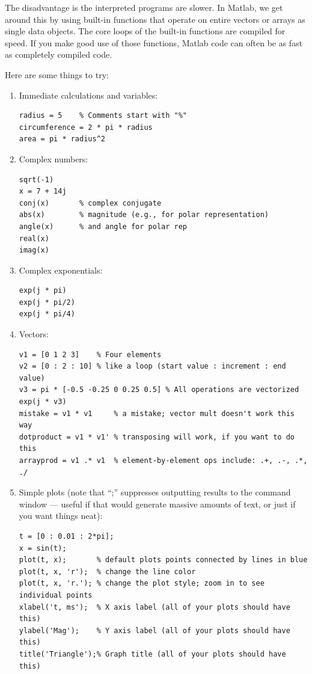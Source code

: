 The disadvantage is the interpreted programs are slower. In Matlab, we
get around this by using built-in functions that operate on entire
vectors or arrays as single data objects. The core loops of the
built-in functions are compiled for speed. If you make good use of
those functions, Matlab code can often be as fast as completely
compiled code.

Here are some things to try:
\begin{enumerate}
\item Immediate calculations and variables:
\begin{lstlisting}[style=Matlab-editor,basicstyle=\mlttfamily\small]
radius = 5    % Comments start with "%"
circumference = 2 * pi * radius
area = pi * radius^2
\end{lstlisting}
\item Complex numbers:
\begin{lstlisting}[style=Matlab-editor,basicstyle=\mlttfamily\small]
sqrt(-1)
x = 7 + 14j
conj(x)       % complex conjugate
abs(x)        % magnitude (e.g., for polar representation)
angle(x)      % and angle for polar rep
real(x)
imag(x)
\end{lstlisting}

\item Complex exponentials:
\begin{lstlisting}[style=Matlab-editor,basicstyle=\mlttfamily\small]
exp(j * pi)
exp(j * pi/2)
exp(j * pi/4)
\end{lstlisting}

\item Vectors:
\begin{lstlisting}[style=Matlab-editor,basicstyle=\mlttfamily\small]
v1 = [0 1 2 3]    % Four elements
v2 = [0 : 2 : 10] % like a loop (start value : increment : end value)
v3 = pi * [-0.5 -0.25 0 0.25 0.5] % All operations are vectorized
exp(j * v3)
mistake = v1 * v1     % a mistake; vector mult doesn't work this way
dotproduct = v1 * v1' % transposing will work, if you want to do this
arrayprod = v1 .* v1  % element-by-element ops include: .+, .-, .*, ./
\end{lstlisting}

\item Simple plots (note that ``;'' suppresses outputting results to
  the command window --- useful if that would generate massive amounts
  of text, or just if you want things neat):
\label{it:simple-plots}
\begin{lstlisting}[style=Matlab-editor,basicstyle=\mlttfamily\small]
t = [0 : 0.01 : 2*pi];
x = sin(t);
plot(t, x);       % default plots points connected by lines in blue
plot(t, x, 'r');  % change the line color
plot(t, x, 'r.'); % change the plot style; zoom in to see individual points
xlabel('t, ms');  % X axis label (all of your plots should have this)
ylabel('Mag');    % Y axis label (all of your plots should have this)
title('Triangle');% Graph title (all of your plots should have this)
\end{lstlisting}

\end{enumerate}

